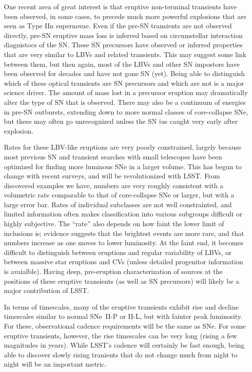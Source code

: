 One recent area of great interest is that eruptive non-terminal
transients have been observed, in some cases, to precede much more
powerful explosions that are seen as Type IIn supernovae.  Even if the
pre-SN transients are not observed directly, pre-SN eruptive mass loss
is inferred based on circumstellar interaction diagnistocs of the SN.
These SN precursors have observed or inferred properties that are very
similar to LBVs and related transients.  This may suggest some link
between them, but then again, most of the LBVs and other SN impostors
have been observed for decades and have not gone SN (yet).  Being able
to distinguish which of these optical transients are SN precursors and
which are not is a major science driver.  The amount of mass lost in a
precursor eruption may dramatically alter the type of SN that is
observed.  There may also be a continuum of energies in pre-SN
outbursts, extending down to more normal classes of core-collapse SNe,
but these may often go unrecognized unless the SN ius caught very
early after explosion.

Rates for these LBV-like eruptions are very poorly constrained,
largely because most previous SN and transient searches with small
telescopes have been optimized for finding more luminous SNe in a
larger volume.  This has begun to change with recent surveys, and will
be revolutionized with LSST.  From discovered examples we have,
numbers are very roughly consistent with a volumetric rate comparable
to that of core-collapse SNe or larger, but with a large error bar.
Rates of individual subclasses are not well constrainted, and limited
information often makes classification into various subgroups
difficult or highly subjective.  The ``rate'' also depends on how
faint the lower limit of inclusions is; evidence suggests that the
brightest events are more rare, and that numbers increase as one moves
to lower luminosity.  At the faint end, it becomes difficult to
distinguish between eruptions and regular variability of LBVs, or
between massive star eruptions and CVs (unless detailed progenitor
information is avaialble).  Having deep, pre-eruption characterization
of sources at the positions of these eruptive transients (as well as
SN precursors) will likely be a major contribution of LSST.

In terms of timescales, many of the eruptive transients exhibit rise
and decline timescales similar to normal SNe~II-P or II-L, but with
fainter peak luminosity.  For these, observational cadence
requirements will be the same as SNe.  For some eruptive transients,
however, the rise timescales can be very long (rising a few magnitudes
in years).  While LSST's cadence will certainly be fast enough, being
able to discover slowly rising tranients that do not change much from
night to night will be an important metric.

